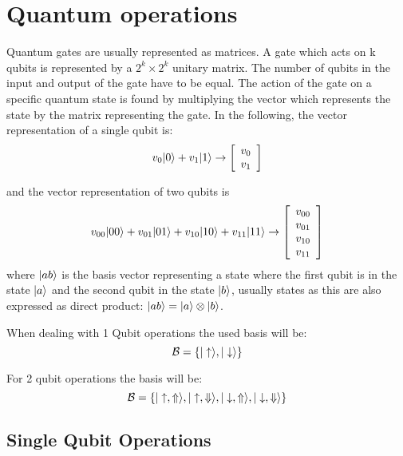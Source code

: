\chapter{Quantum operations}
\label{operations}
Quantum gates are usually represented as matrices. A gate which acts on k qubits is represented by a $2^k\times2^k$ unitary matrix.
The number of qubits in the input and output of the gate have to be equal. The action of the gate on a specific quantum state is found by multiplying the vector which represents the state by the matrix representing the gate. In the following, the vector representation of a single qubit is:
\begin{equation}
  v_0|0\rangle + v_1|1\rangle \rightarrow \left[\begin{array}{c}
  v_0 \\
  v_1
  \end{array}\right]
\end{equation}

and the vector representation of two qubits is
\begin{equation}
  v_{00}|00\rangle + v_{01}|01\rangle + v_{10}|10\rangle + v_{11}|11\rangle \rightarrow
  \left[\begin{array}{c}
  v_{00} \\
  v_{01} \\
  v_{10} \\
  v_{11}
  \end{array}\right]
\end{equation}
where $|ab\rangle$ is the basis vector representing a state where the first qubit is in the state $|a\rangle$ and the second qubit in the state $|b\rangle$, usually states as this are also expressed as direct product: $|ab\rangle=|a\rangle\otimes|b\rangle$.

When dealing with 1 Qubit operations the used basis will be:
\begin{equation}
  \mathcal{B} = \left\{|\uparrow\rangle,|\downarrow\rangle\right\}
\end{equation}

For 2 qubit operations the basis will be:
\begin{equation}  %
  \mathcal{B} = \left\{\ket{\uaw,\Uaw},\ket{\uaw,\Daw},
                       \ket{\daw,\Uaw},\ket{\daw,\Daw}\right\}
\label{basis2}
\end{equation}


\section{Single Qubit Operations}

